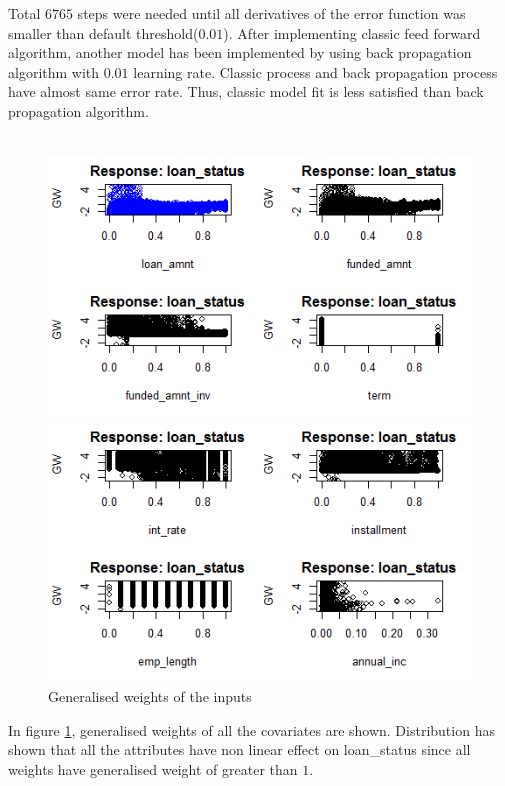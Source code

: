 \documentclass{article}[]
\begin{document}
Total $6765$ steps were needed until all derivatives of the error function  was smaller than default threshold($0.01$). After implementing classic feed forward algorithm, another model has been implemented by using back propagation algorithm with $0.01$ learning rate. Classic process and back propagation process have almost same error rate. Thus, classic model fit is less satisfied than back propagation algorithm.\\\\
\begin{figure}
    \centering
    \begin{minipage}{0.5\textwidth}
        \centering
        \includegraphics[width=1.1\textwidth]{image3.png} %
    \end{minipage}\hfill
    \begin{minipage}{0.5\textwidth}
        \centering
        \includegraphics[width=1.1\textwidth]{image4.png} %
    \end{minipage}
\caption{Generalised weights of the inputs}
\label{fig:gw}
\end{figure}
In figure \ref{fig:gw}, generalised weights of all the covariates are shown. Distribution has shown that all the attributes have non linear effect on loan\_status since all weights have generalised weight of greater than $1$. 

 






 
\end{document}
